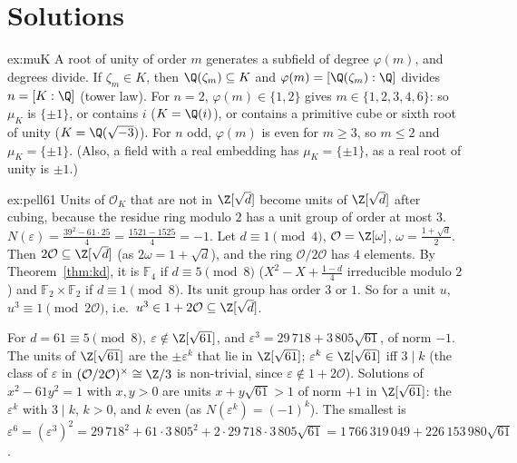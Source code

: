 \section{Solutions}

\begin{solution}{ex:muK}
\idea A root of unity of order $m$ generates a subfield of degree $\varphi(m)$, and degrees divide.
\writeup If $\zeta_m\in K$, then $\Q(\zeta_m)\subseteq K$ and $\varphi(m)=[\Q(\zeta_m):\Q]$ divides $n=[K:\Q]$ (tower law).
For $n=2$, $\varphi(m)\in\{1,2\}$ gives $m\in\{1,2,3,4,6\}$: so $\mu_K$ is $\{\pm1\}$, or contains $i$ ($K=\Q(i)$), or
contains a primitive cube or sixth root of unity ($K=\Q(\sqrt{-3})$). For $n$ odd, $\varphi(m)$ is even for $m\ge3$, so
$m\le2$ and $\mu_K=\{\pm1\}$. (Also, a field with a real embedding has $\mu_K=\{\pm1\}$, as a real root of unity is
$\pm1$.)
\end{solution}

\begin{solution}{ex:pell61}
\idea Units of $\mathcal O_K$ that are not in $\Z[\sqrt d]$ become units of $\Z[\sqrt d]$ after cubing, because the residue
ring modulo $2$ has a unit group of order at most $3$.
\writeup $N(\varepsilon)=\frac{39^2-61\cdot25}4=\frac{1521-1525}4=-1$. Let $d\equiv1\pmod4$, $\mathcal O=\Z[\omega]$,
$\omega=\frac{1+\sqrt d}2$. Then $2\mathcal O\subseteq\Z[\sqrt d]$ (as $2\omega=1+\sqrt d$), and the ring $\mathcal O/2\mathcal
O$ has $4$ elements. By Theorem~\ref{thm:kd}, it is $\mathbb F_4$ if $d\equiv5\pmod8$ ($X^2-X+\frac{1-d}4$ irreducible modulo
$2$) and $\mathbb F_2\times\mathbb F_2$ if $d\equiv1\pmod8$. Its unit group has order $3$ or $1$. So for a unit $u$, $u^3\equiv1
\pmod{2\mathcal O}$, i.e.\ $u^3\in1+2\mathcal O\subseteq\Z[\sqrt d]$.

For $d=61\equiv5\pmod8$, $\varepsilon\notin\Z[\sqrt{61}]$, and $\varepsilon^3=29\,718+3\,805\sqrt{61}$, of norm $-1$. The units
of $\Z[\sqrt{61}]$ are the $\pm\varepsilon^k$ that lie in $\Z[\sqrt{61}]$; $\varepsilon^k\in\Z[\sqrt{61}]$ iff $3\mid k$ (the class
of $\varepsilon$ in $(\mathcal O/2\mathcal O)^\times\cong\Z/3$ is non-trivial, since $\varepsilon\notin1+2\mathcal O$). Solutions of
$x^2-61y^2=1$ with $x,y>0$ are units $x+y\sqrt{61}>1$ of norm $+1$ in $\Z[\sqrt{61}]$: the $\varepsilon^{k}$ with $3\mid k$,
$k>0$, and $k$ even (as $N(\varepsilon^k)=(-1)^k$). The smallest is $\varepsilon^6=(\varepsilon^3)^2=29\,718^2+61\cdot3\,805^2+
2\cdot29\,718\cdot3\,805\sqrt{61}=1\,766\,319\,049+226\,153\,980\sqrt{61}$.
\end{solution}

